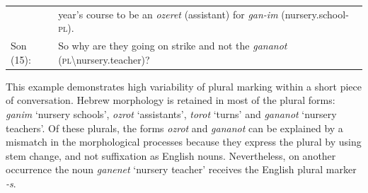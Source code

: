 \begin{table}
\begin{tabular}{p{1.3cm}p{10.3cm}} 
    & year's course to be an \textit{ozeret} (assistant) for \textit{gan-im} (nursery.school-\textsc{pl}). \\ 
    Son (15): & So why are they going on strike and not the \textit{gananot} (\textsc{pl}\textbackslash nursery.teacher)? \\
	\end{tabular}
\end{table}
\z

\noindent This example demonstrates high variability of plural marking within a short piece of conversation. Hebrew morphology is retained in most of the plural forms: \textit{ganim} `nursery schools', \textit{ozrot} `assistants', \textit{torot} `turns' and \textit{gananot} `nursery teachers'. Of these plurals, the forms \textit{ozrot} and \textit{gananot} can be explained by a mismatch in the morphological processes because they express the plural by using stem change, and not suffixation as English nouns. Nevertheless, on another occurrence the noun \textit{ganenet} `nursery teacher' receives the English plural marker \textit{-s}.

